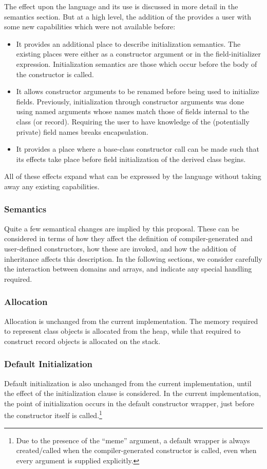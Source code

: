 The effect upon the language and its use is discussed in more detail in the
semantics section.  But at a high level, the addition of
the  provides a user with some new capabilities
which were not available before:
\begin{itemize}
\item It provides an additional place to describe initialization semantics.  The
existing places were either as a constructor argument or in the
field-initializer expression.  Initialization semantics are those which occur
before the body of the constructor is called.
\item It allows constructor arguments to be renamed before being used to
initialize fields.  Previously, initialization
through constructor arguments was done using named arguments whose names match
those of fields internal to the class (or record).  Requiring the user to have
knowledge of the (potentially private) field names breaks encapsulation.
\item It provides a place where a base-class constructor call can be made such
that its effects take place before field initialization of the derived class begins.
\end{itemize}
All of these effects expand what can be expressed by the language without taking
away any existing capabilities.

\subsubsection{Semantics}

Quite a few semantical changes are implied by this proposal.  These can be
considered in terms of how they affect the definition of compiler-generated and
user-defined constructors, how these are invoked, and how the addition of
inheritance affects this description.  In the following sections, we consider carefully the interaction
between domains and arrays, and indicate any special handling required.

\subsubsection{Allocation}

Allocation is unchanged from the current implementation.  The memory
required to represent class objects is allocated from the heap, while that
required to construct record objects is allocated on the stack.  

\subsubsection{Default Initialization} 
Default initialization is also unchanged from the current
implementation, until the effect of the initialization clause is considered.  In
the current implementation, the point of initialization occurs in the default
constructor wrapper, just before the constructor itself is called.\footnote{Due
to the presence of the ``meme'' argument, a default wrapper is always
created/called when the compiler-generated constructor is called, even when
every argument is supplied explicitly.}  

